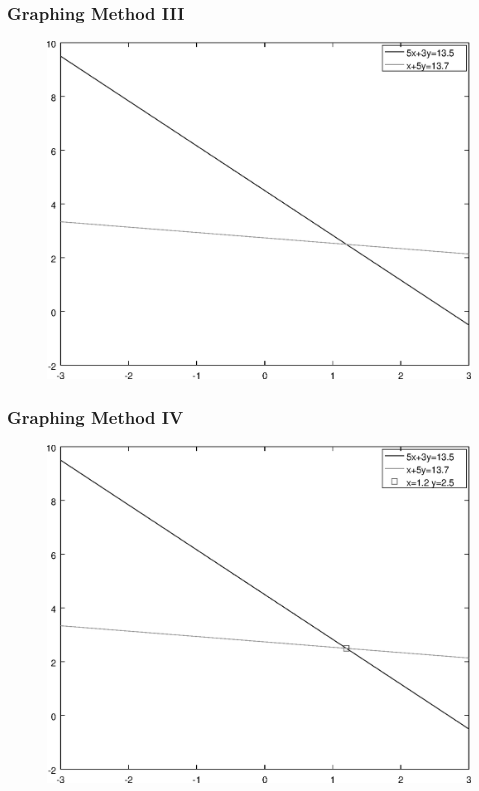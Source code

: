 \documentclass[xcolor=dvipsnames]{beamer}
\begin{document}
\begin{frame}
  \frametitle{Graphing Method III}
  \begin{figure}[h]
    \includegraphics[scale=.6]{./gm-03-SystemsEquations-02.eps}
  \end{figure}
\end{frame}

\begin{frame}
  \frametitle{Graphing Method IV}
  \begin{figure}[h]
    \includegraphics[scale=.6]{./gm-03-SystemsEquations-03.eps}
  \end{figure}
\end{frame}
\end{document}
